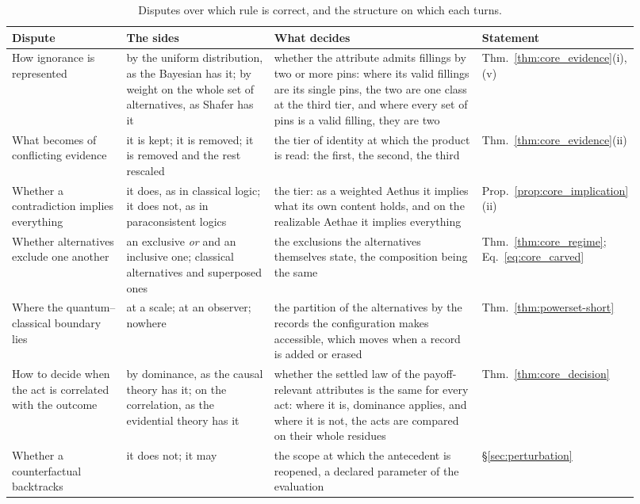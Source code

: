 \documentclass[11pt]{article}
\theoremstyle{definition}
\begin{document}
\begin{table}[htbp]
\centering
\small
\caption{Disputes over which rule is correct, and the structure on which each turns.}
\label{tab:core_disputes}
\begin{tabular}{@{}>{\raggedright\arraybackslash}p{0.19\linewidth}>{\raggedright\arraybackslash}p{0.25\linewidth}>{\raggedright\arraybackslash}p{0.36\linewidth}>{\raggedright\arraybackslash}p{0.12\linewidth}@{}}
\toprule
Dispute & The sides & What decides & Statement \\
\midrule
How ignorance is represented & by the uniform distribution, as the Bayesian has it; by weight on the whole set of alternatives, as Shafer has it & whether the attribute admits fillings by two or more pins: where its valid fillings are its single pins, the two are one class at the third tier, and where every set of pins is a valid filling, they are two & Thm.~\ref{thm:core_evidence}(i), (v) \\
\addlinespace[2pt]
What becomes of conflicting evidence & it is kept; it is removed; it is removed and the rest rescaled & the tier of identity at which the product is read: the first, the second, the third & Thm.~\ref{thm:core_evidence}(ii) \\
\addlinespace[2pt]
Whether a contradiction implies everything & it does, as in classical logic; it does not, as in paraconsistent logics & the tier: as a weighted Aethus it implies what its own content holds, and on the realizable Aethae it implies everything & Prop.~\ref{prop:core_implication}(ii) \\
\addlinespace[2pt]
Whether alternatives exclude one another & an exclusive \emph{or} and an inclusive one; classical alternatives and superposed ones & the exclusions the alternatives themselves state, the composition being the same & Thm.~\ref{thm:core_regime}; Eq.~\eqref{eq:core_carved} \\
\addlinespace[2pt]
Where the quantum--classical boundary lies & at a scale; at an observer; nowhere & the partition of the alternatives by the records the configuration makes accessible, which moves when a record is added or erased & Thm.~\ref{thm:powerset-short} \\
\addlinespace[2pt]
How to decide when the act is correlated with the outcome & by dominance, as the causal theory has it; on the correlation, as the evidential theory has it & whether the settled law of the payoff-relevant attributes is the same for every act: where it is, dominance applies, and where it is not, the acts are compared on their whole residues & Thm.~\ref{thm:core_decision} \\
\addlinespace[2pt]
Whether a counterfactual backtracks & it does not; it may & the scope at which the antecedent is reopened, a declared parameter of the evaluation & \S\ref{sec:perturbation} \\
\bottomrule
\end{tabular}
\end{table}
\end{document}
